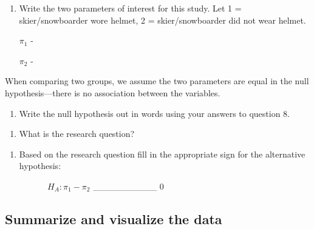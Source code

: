 \documentclass[
]{report}
\providecommand{\tightlist}{%
  \setlength{\itemsep}{0pt}\setlength{\parskip}{0pt}}
\begin{document}
\vspace{0.5in}

\begin{enumerate}
\def\labelenumi{\arabic{enumi}.}
\setcounter{enumi}{7}
\item
  Write the two parameters of interest for this study. Let 1 = skier/snowboarder wore helmet, 2 = skier/snowboarder did not wear helmet.

  \(\pi_1\) -
  \vspace{0.5in}

  \(\pi_2\) -
  \vspace{0.5in}
\end{enumerate}

\newpage

When comparing two groups, we assume the two parameters are equal in the null hypothesis---there is no association between the variables.

\begin{enumerate}
\def\labelenumi{\arabic{enumi}.}
\setcounter{enumi}{8}
\tightlist
\item
  Write the null hypothesis out in words using your answers to question 8.
\end{enumerate}

\vspace{1in}

\begin{enumerate}
\def\labelenumi{\arabic{enumi}.}
\setcounter{enumi}{9}
\tightlist
\item
  What is the research question?
\end{enumerate}

\vspace{1in}

\begin{enumerate}
\def\labelenumi{\arabic{enumi}.}
\setcounter{enumi}{10}
\tightlist
\item
  Based on the research question fill in the appropriate sign for the alternative hypothesis:
  \vspace{0.25in}
\end{enumerate}

~~~~~~~~~~\(H_A: \pi_1 -\pi_2\) \_\_\_\_\_\_\_\_\_\_ 0

\hypertarget{summarize-and-visualize-the-data}{%
\subsection{Summarize and visualize the data}\label{summarize-and-visualize-the-data}}
\end{document}

